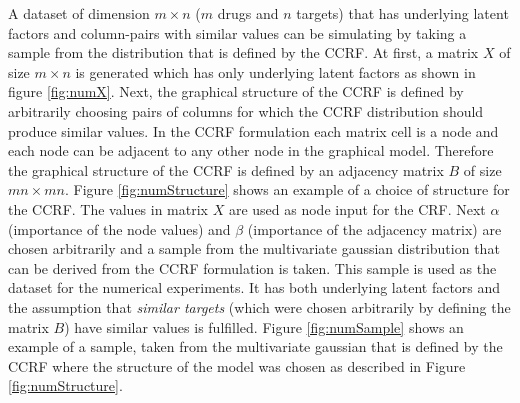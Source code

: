 A dataset of dimension $m \times n$ ($m$ drugs and $n$ targets) that has underlying latent factors and column-pairs with similar values can be simulating by taking a sample from the distribution that is defined by the CCRF. At first, a matrix $X$ of size $m \times n$ is generated which has only underlying latent factors as shown in figure \ref{fig:numX}. Next, the graphical structure of the CCRF is defined by arbitrarily choosing pairs of columns for which the CCRF distribution should produce similar values. In the CCRF formulation each matrix cell is a node and each node can be adjacent to any other node in the graphical model. Therefore the graphical structure of the CCRF is defined by an adjacency matrix $B$ of size $mn \times mn$. Figure \ref{fig:numStructure} shows an example of a choice of structure for the CCRF.  The values in matrix $X$ are used as node input for the CRF. Next $\alpha$ (importance of the node values) and $\beta$ (importance of the adjacency matrix) are chosen arbitrarily and a sample from the multivariate gaussian distribution that can be derived from the CCRF formulation is taken. This sample is used as the dataset for the numerical experiments. It has both underlying latent factors and the assumption that \textit{similar targets} (which were chosen arbitrarily by defining the matrix $B$) have similar values is fulfilled. Figure \ref{fig:numSample} shows an example of a sample, taken from the multivariate gaussian that is defined by the CCRF where the structure of the model was chosen as described in Figure \ref{fig:numStructure}.

